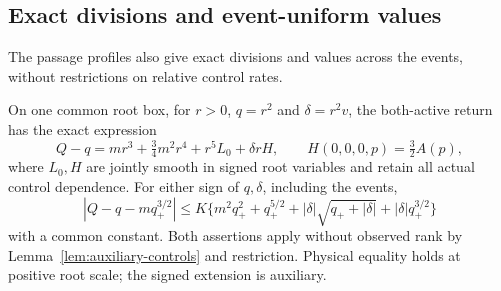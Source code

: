 \subsection{Exact divisions and event-uniform values}

The passage profiles also give exact divisions and values across the events,
without restrictions on relative control rates.

\begin{lemma}
\label{lem:exact-value-division}
On one common root box, for $r>0$, $q=r^2$ and $\delta=r^2v$, the
both-active return has the exact expression
\begin{equation}\label{eq:actual-both-active-division}
 Q-q=mr^3+\tfrac34m^2r^4+r^5L_0+\delta rH,
 \qquad H(0,0,0,p)=\tfrac32A(p),
\end{equation}
where $L_0,H$ are jointly smooth in signed root variables and retain all
actual control dependence. For either sign of $q,\delta$, including the
events,
\begin{equation}\label{eq:quartic-global-value}
 |Q-q-mq_+^{3/2}|
 \le K\{m^2q_+^2+q_+^{5/2}
       +|\delta|\sqrt{q_++|\delta|}+|\delta|q_+^{3/2}\}
\end{equation}
with a common constant. Both assertions apply without observed rank by
Lemma~\ref{lem:auxiliary-controls} and restriction. Physical equality
holds at positive root scale; the signed extension is auxiliary.
\end{lemma}

